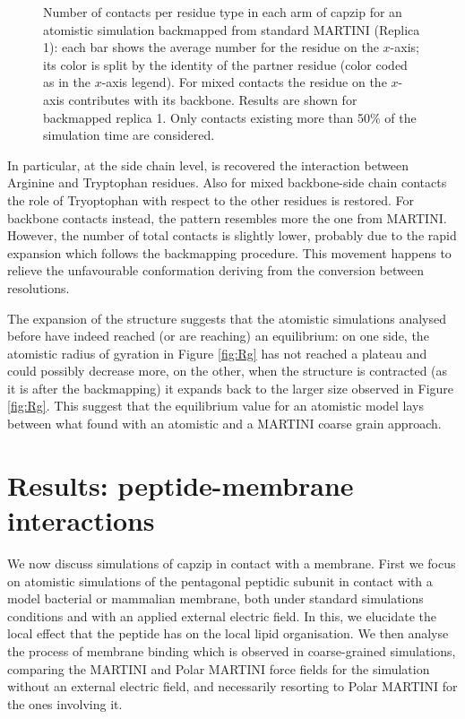 \begin{figure}
\caption[Atomistic backmapped simulations: contacts]{Number of contacts per residue type in each arm of capzip for an atomistic simulation backmapped from standard MARTINI (Replica 1): each bar shows the average number for the residue on the $x$-axis; its color is split by the identity of the partner residue (color coded as in the $x$-axis legend). For mixed contacts the residue on the $x$-axis contributes with its backbone. Results are shown for backmapped replica 1. Only contacts existing more than 50\% of the simulation time are considered.}
\label{fig:BM_contacts}
\vspace{1cm}
\end{figure}
%
In particular, at the side chain level, is recovered the interaction between Arginine and Tryptophan residues. Also for mixed backbone-side chain contacts the role of Tryoptophan with respect to the other residues is restored. For backbone contacts instead, the pattern resembles more the one from MARTINI. However, the number of total contacts is slightly lower, probably due to the rapid expansion which follows the backmapping procedure. This movement happens to relieve the unfavourable conformation deriving from the conversion between resolutions.

The expansion of the structure suggests that the atomistic simulations analysed before have indeed reached (or are reaching) an equilibrium: on one side, the atomistic radius of gyration in Figure \ref{fig:Rg} has not reached a plateau and could possibly decrease more, on the other, when the structure is contracted (as it is after the backmapping) it expands back to the larger size observed in Figure \ref{fig:Rg}. This suggest that the equilibrium value for an atomistic model lays between what found with an atomistic and a MARTINI coarse grain approach.


\clearpage
\section{Results: peptide-membrane interactions}

We now discuss simulations of capzip in contact with a membrane. First we focus on atomistic simulations of the pentagonal peptidic subunit in contact with a model bacterial or mammalian membrane, both under standard simulations conditions and with an applied external electric field. In this, we elucidate the local effect that the peptide has on the local lipid organisation.
%
We then analyse the process of membrane binding which is observed in coarse-grained simulations, comparing the MARTINI and Polar MARTINI force fields for the simulation without an external electric field, and necessarily resorting to Polar MARTINI for the ones involving it. 


